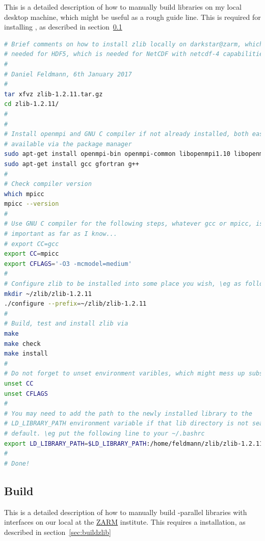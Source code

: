 \documentclass[a4paper, 11pt, DIV=11]{scrartcl}
\begin{document}
This is a detailed description of how to manually build 
libraries on my local desktop machine, which might be useful as
a rough guide line. This is required
for installing \hdf, as described in section~\ref{sec:buildhdf}
\begin{lstlisting}[language=bash]
# Brief comments on how to install zlib locally on darkstar@zarm, which is
# needed for HDF5, which is needed for NetCDF with netcdf-4 capabilities.
#
# Daniel Feldmann, 6th January 2017
# 
tar xfvz zlib-1.2.11.tar.gz
cd zlib-1.2.11/
#
#
# Install openmpi and GNU C compiler if not already installed, both easily
# available via the package manager
sudo apt-get install openmpi-bin openmpi-common libopenmpi1.10 libopenmpi-dev mpi-default-bin mpi-default-dev
sudo apt-get install gcc gfortran g++
#
# Check compiler version
which mpicc
mpicc --version
#
# Use GNU C compiler for the following steps, whatever gcc or mpicc, is not
# important as far as I know...
# export CC=gcc
export CC=mpicc
export CFLAGS='-O3 -mcmodel=medium'
#
# Configure zlib to be installed into some place you wish, \eg as follows 
mkdir ~/zlib/zlib-1.2.11
./configure --prefix=~/zlib/zlib-1.2.11
#
# Build, test and install zlib via
make
make check
make install
#
# Do not forget to unset environment varibles, which might mess up subsequent builds
unset CC
unset CFLAGS
#
# You may need to add the path to the newly installed library to the
# LD_LIBRARY_PATH environment variable if that lib directory is not searched by
# default. \eg put the following line to your ~/.bashrc
export LD_LIBRARY_PATH=$LD_LIBRARY_PATH:/home/feldmann/zlib/zlib-1.2.11/lib
# 
# Done!
\end{lstlisting}



\subsection{Build \hdf}
\label{sec:buildhdf}
This is a detailed description of how to manually build \mpi-parallel \hdf
libraries with \fortran interfaces on our local  at the
\href{https://www.zarm.uni-bremen.de/en/}{ZARM} institute. This requires
a  installation, as described in section~\ref{sec:buildzlib}
\end{document}
